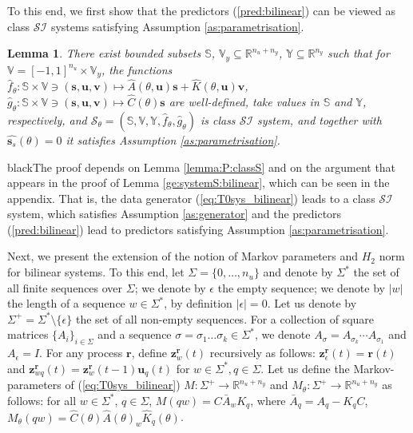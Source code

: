 \documentclass{ifacconf}
\def\eqref#1{(\ref{#1})}
\def\rvu{{\mathbf{i}}}
\def\rvr{{\mathbf{r}}}
\def\rvs{{\mathbf{s}}}
\def\rvu{{\mathbf{u}}}
\def\rvz{{\mathbf{z}}}
\def\vs{{\bm{s}}}
\def\vu{{\bm{u}}}
\def\vv{{\bm{v}}}
\newtheorem{lemma}{Lemma}[section]
\newcommand{\class}{\(\mathcal{SI}\)}
\begin{document}
To this end, we first show that the predictors \eqref{pred:bilinear} can be viewed as 
class \class{} systems satisfying Assumption \ref{as:parametrisation}.
\begin{lemma}
  \label{ge:classS:bilinear:predictor}
  There exist bounded subsets $\mathbb{S}$, $\mathbb{V}_y \subseteq \mathbb{R}^{n_u+n_y}$, 
  $\mathbb{Y} \subseteq \mathbb{R}^{n_y}$ such that for $\mathbb{V}=[-1,1]^{n_u} \times \mathbb{V}_y$, 
  the functions $\hat{f}_{\theta}:\mathbb{S} \times \mathbb{V} \ni (\vs,\vu,\vv)
  \mapsto \hat{A}(\theta,\vu)\vs+\hat{K}(\theta,\vu)\vv$, 
  $\hat{g}_{\theta}:\mathbb{S} \times \mathbb{V} \ni (\vs,\vu,\vv)
  \mapsto \hat{C}(\theta)\vs$ are well-defined, take values in $\mathbb{S}$ and $\mathbb{Y}$, respectively,
  and $\mathcal{S}_{\theta}=(\mathbb{S},\mathbb{V},\mathbb{Y},\hat{f}_{\theta},\hat{g}_{\theta})$
  is class \class{} system, and together with $\hat{\rvs_s}(\theta)=0$ it satisfies Assumption \ref{as:parametrisation}. 
\end{lemma}

\begin{color}{black}The proof depends on Lemma \ref{lemma:P:classS} and on the argument that appears in the proof of Lemma \ref{ge:systemS:bilinear}, which can be seen in the appendix. %
That is, the data generator \eqref{eq:T0sys_bilinear} leads to a class \class{}
system, which satisfies Assumption \ref{as:generator} and the predictors \eqref{pred:bilinear}
lead to predictors satisfying Assumption \ref{as:parametrisation}.\end{color}


Next, we present the extension of the notion of Markov parameters and $H_2$ norm for bilinear systems.
To this end, let $\Sigma=\{0,\ldots,n_u\}$ and denote by $\Sigma^{*}$ the set of all finite sequences over $\Sigma$;
  we denote by $\epsilon$ the empty sequence; we denote by $|w|$ the length of a sequence $w \in \Sigma^*$, by definition $| \epsilon | = 0$. Let us denote by $\Sigma^{+}=\Sigma^{*} \setminus \{\epsilon\}$ the set of all non-empty sequences. For a collection of square matrices $\{A_i\}_{i \in \Sigma}$ and a sequence $\sigma=\sigma_1\ldots\sigma_k \in \Sigma^*$, we denote $A_{\sigma}=A_{\sigma_k}\cdots A_{\sigma_1}$ and $A_{\epsilon}=I$.
  For any process $\rvr$, define $\rvz_w^{\rvr}(t)$ recursively as follows: $\rvz^{\rvr}_{\epsilon}(t)=\rvr(t)$ and $\rvz^{\rvr}_{wq}(t)=\rvz^{\rvr}_{w}(t-1)\rvu_q(t)$ for $w \in \Sigma^*, q \in \Sigma$.
  Let us define the Markov-parameters of \eqref{eq:T0sys_bilinear}
  $M:\Sigma^{+} \rightarrow \mathbb{R}^{n_u+n_y }$ and $M_{\theta}:\Sigma^{+} \rightarrow \mathbb{R}^{n_u+n_y }$
  as follows: for all $w \in \Sigma^{*}$, $q \in \Sigma$,
  $M(qw)=C\bar{A}_wK_q$, where $\bar{A}_q=A_q-K_qC$, 
  $M_{\theta}(qw)=\hat{C}(\theta)\hat{A}(\theta)_{w}\hat{K}_{q}(\theta)$.
\end{document}
